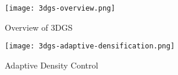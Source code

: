 \begin{frame}[c]
	\begin{figure}[htbp]
		\centering
		\texttt{[image: 3dgs-overview.png]}
		\caption{Overview of 3DGS}
	\end{figure}
\end{frame}
\begin{frame}[c]
	\begin{figure}[htbp]
		\centering
		\texttt{[image: 3dgs-adaptive-densification.png]}
		\caption{Adaptive Density Control}
	\end{figure}
\end{frame}
